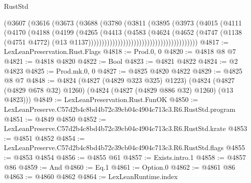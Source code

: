 \begin{lexlean}{RustStd}
\begin{coremodule}
                                            (@3607
                                              (@3616
                                                (@3673
                                                  (@3688
                                                    (@3780
                                                      (@3811
                                                        (@3895
                                                          (@3973
                                                            (@4015
                                                              (@4111
                                                                (@4170
                                                                  (@4188
                                                                    (@4199
                                                                      (@4265
                                                                        (@4413
                                                                          (@4583
                                                                            (@4624
                                                                              (@4652
                                                                                (@4747
                                                                                  (@1138
                                                                                    (@4751 @4772)
                                                                                    (@13
                                                                                      @1137)))))))))))))))))))))))))))))))))))))))))
@4817 := LexLeanPreservation.Rust.Flags
@4818 := Prod.{0, 0}
@4820 := @4818 @8 @7
@4821 := @4818 @4820
@4822 := Bool
@4823 := @4821 @4822
@4824 := @2 @4823
@4825 := Prod.mk.{0, 0}
@4827 := @4825 @4820 @4822
@4829 := @4825 @8 @7
@4848 := @4824
    (@4827 (@4829 @323 @325) @1223)
    (@4824 (@4827 (@4829 @678 @32) @1260) (@4824 (@4827 (@4829 @886 @32) @1260) (@13 @4823)))
@4849 := LexLeanPreservation.Rust.FunOK
@4850 := LexLeanPreserve.C57d2b4c8bd4b72c39cb04c4904c713c3.R6.RustStd.program
@4851 := @4849 @4850
@4852 := LexLeanPreserve.C57d2b4c8bd4b72c39cb04c4904c713c3.R6.RustStd.krate
@4853 := @4851 @4852
@4854 := LexLeanPreserve.C57d2b4c8bd4b72c39cb04c4904c713c3.R6.RustStd.flags
@4855 := @4853 @4854
@4856 := @4855 @61
@4857 := Exists.intro.{1}
@4858 := @4857 @86
@4859 := And
@4860 := Eq.{1}
@4861 := Option.{0}
@4862 := @4861 @86
@4863 := @4860 @4862
@4864 := LexLeanRuntime.index

\end{coremodule}
\end{lexlean}
